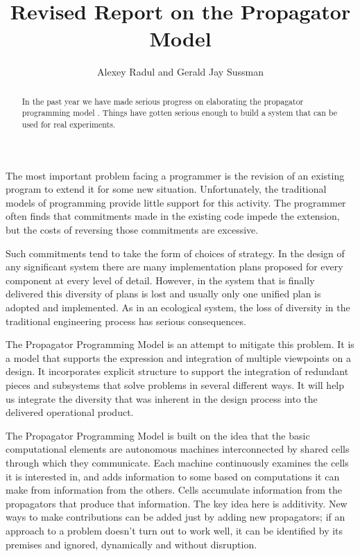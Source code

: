 \documentclass[12pt,letterpaper,english]{article}
\title{Revised Report on the Propagator Model}
\author{Alexey Radul and Gerald Jay Sussman}
\date{}
\newlength{\locallinewidth}
\begin{document}
\maketitle

\setlength{\locallinewidth}{\linewidth}

\begin{abstract}
In the past year we have made serious progress
on elaborating the propagator programming model
\cite{art-thesis, art}.  Things have gotten serious enough to
build a system that can be used for real
experiments.
\end{abstract}

The most important problem facing a programmer is the revision
of an existing program to extend it for some new situation.
Unfortunately, the traditional models of programming provide little
support for this activity.  The programmer often finds that
commitments made in the existing code impede the extension, but the
costs of reversing those commitments are excessive.

Such commitments tend to take the form of choices of strategy.  In the
design of any significant system there are many implementation plans
proposed for every component at every level of detail.  However, in
the system that is finally delivered this diversity of plans is lost
and usually only one unified plan is adopted and implemented.  As in
an ecological system, the loss of diversity in the traditional
engineering process has serious consequences.

The Propagator Programming Model is an attempt to mitigate this
problem.  It is a model that supports the expression and integration
of multiple viewpoints on a design.  It incorporates explicit
structure to support the integration of redundant pieces and
subsystems that solve problems in several different ways.  It will
help us integrate the diversity that was inherent in the design
process into the delivered operational product.

The Propagator Programming Model is built on the idea that the basic
computational elements are autonomous machines interconnected by
shared cells through which they communicate.  Each machine
continuously examines the cells it is interested in, and adds
information to some based on computations it can make from information
from the others.  Cells accumulate information from the propagators
that produce that information.  The key idea here is additivity.  New
ways to make contributions can be added just by adding new
propagators; if an approach to a problem doesn't turn out to work
well, it can be identified by its premises and ignored, dynamically
and without disruption.
\end{document}
